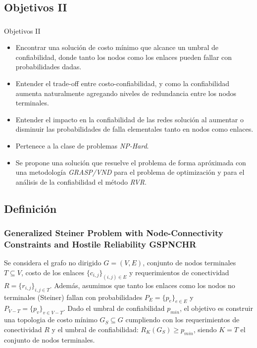 \subsection{Objetivos II}
\begin{frame}
	\frametitle{}
    \begin{block}{Objetivos II}
	\begin{itemize} 
    	\item Encontrar una solución de costo mínimo que alcance un umbral de confiabilidad, donde tanto los nodos como los enlaces pueden fallar con probabilidades dadas.
		\item Entender el trade-off entre costo-confiabilidad, y como la confiabilidad aumenta naturalmente agregando niveles de redundancia entre los nodos terminales.
		\item Entender el impacto en la confiabilidad de las redes solución al aumentar o disminuir las probabilidades de falla elementales tanto en nodos como enlaces.
    	\item Pertenece a la clase de problemas \emph{NP-Hard}.
    	\item Se propone una solución que resuelve el problema de forma apróximada con una metodología \emph{GRASP/VND} para el problema de optimización y para el análisis de la confiabilidad el método \emph{RVR}.
	\end{itemize} 
    \end{block}
\end{frame}

\subsection{Definición}
\begin{frame}\frametitle{Generalized Steiner Problem with Node-Connectivity Constraints and
Hostile Reliability GSPNCHR}
    \begin{definition}[GSPNCHR]
Se considera el grafo no dirigido $G=(V,E)$, conjunto de nodos terminales $T \subseteq V$, costo de los enlaces $\{c_{i,j}\}_{(i,j) \in E}$ y requerimientos de conectividad $R=\{r_{i,j}\}_{i,j \in T}$. Además, asumimos que tanto los enlaces como los nodos no terminales (Steiner) fallan con probabilidades $P_E=\{p_e\}_{e\in E}$ y $P_{V-T}=\{p_v\}_{v\in V-T}$. 
Dado el umbral de confiabilidad $p_{min}$, el objetivo es construir una topologia de costo mínimo $G_S \subseteq G$ cumpliendo con los requerimientos de conectividad $R$ y el umbral de confiabilidad: $R_{K}(G_S) \geq p_{min}$, siendo $K=T$ el conjunto de nodos terminales.
\end{definition}
\end{frame}

